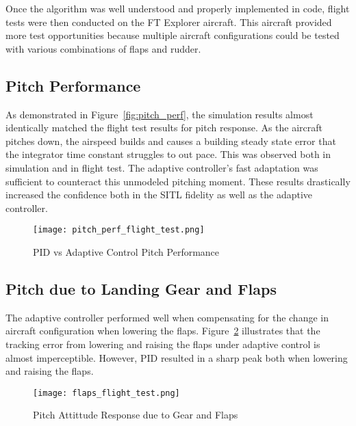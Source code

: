 Once the algorithm was well understood and properly implemented in code, flight tests were then conducted on the FT Explorer aircraft.  This aircraft provided more test opportunities because multiple aircraft configurations could be tested with various combinations of flaps and rudder.  

\subsection{Pitch Performance}
As demonstrated in Figure~\ref{fig:pitch_perf}, the simulation results almost identically matched the flight test results for pitch response.  As the aircraft pitches down, the airspeed builds and causes a building steady state error that the integrator time constant struggles to out pace.  This was observed both in simulation and in flight test.  The \Lone adaptive controller's fast adaptation was sufficient to counteract this unmodeled pitching moment.  These results drastically increased the confidence both in the \ac{SITL} fidelity as well as the \Lone adaptive controller.
\begin{figure}[h!]
 \centering
  \texttt{[image: pitch\_perf\_flight\_test.png]}
  \caption{PID vs \Lone Adaptive Control Pitch Performance}
  \label{fig:pitch_perf_flight_test}
\end{figure}

\subsection{Pitch due to Landing Gear and Flaps}
The \Lone adaptive controller performed well when compensating for the change in aircraft configuration when lowering the flaps.  Figure~\ref{fig:flaps_flight_test} illustrates that the tracking error from lowering and raising the flaps under adaptive control is almost imperceptible.  However, \ac{PID} resulted in a sharp peak both when lowering and raising the flaps.
\begin{figure}[h!]
 \centering
  \texttt{[image: flaps\_flight\_test.png]}
  \caption{Pitch Attittude Response due to Gear and Flaps}
  \label{fig:flaps_flight_test}
\end{figure}

